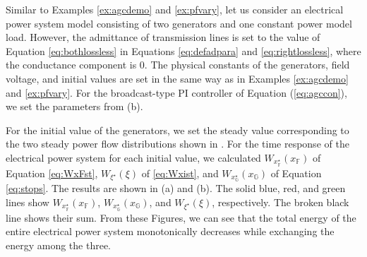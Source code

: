 \documentclass[graybox, envcountchap]{svmult}
\begin{document}
\begin{例}\label{ex:nonlinene}
Similar to Examples \ref{ex:agcdemo} and \ref{ex:pfvary}, let us consider an electrical power system model consisting of two generators and one constant power model load.
However, the admittance of transmission lines is set to the value of Equation \ref{eq:bothlossless} in Equations \ref{eq:defadpara} and \ref{eq:rightlossless}, where the conductance component is 0.
The physical constants of the generators, field voltage, and initial values are set in the same way as in Examples \ref{ex:agcdemo} and \ref{ex:pfvary}.
For the broadcast-type PI controller of Equation (\ref{eq:agccon}), we set the parameters from  (b).


For the initial value of the generators, we set the steady value corresponding to the two steady power flow distributions shown in .
For the time response of the electrical power system for each initial value, we calculated $W_{x^{\star}_{\mathds{F}}}(x_{\mathds{F}})$ of Equation \ref{eq:WxFst}, $W_{\xi^{\star}}(\xi)$ of \ref{eq:Wxist}, and $W_{x^{\star}_{\mathds{G}}}(x_{\mathds{G}})$ of Equation \ref{eq:stops}.
The results are shown in  (a) and (b).
The solid blue, red, and green lines show $W_{x^{\star}_{\mathds{F}}}(x_{\mathds{F}})$, $W_{x^{\star}_{\mathds{G}}}(x_{\mathds{G}})$, and $W_{\xi^{\star}}(\xi)$, respectively. The broken black line shows their sum. From these Figures, we can see that the total energy of the entire electrical power system monotonically decreases while exchanging the energy among the three.
\end{例}
\end{document}
